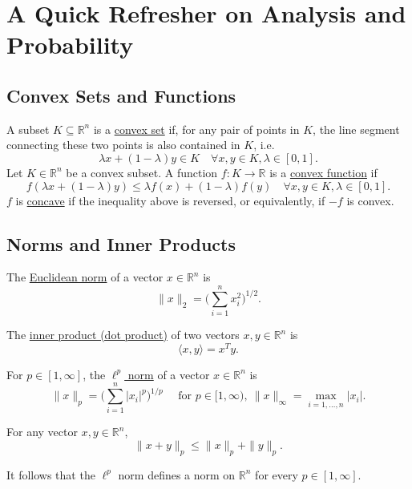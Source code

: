 \section{A Quick Refresher on Analysis and Probability}


\subsection{Convex Sets and Functions}

\begin{definition}[]
\label{def:1.1.1}
A subset $K \subseteq \mathbb{R}^n$ is a \underline{convex set} if, for any pair of points in $K$, the line 
segment connecting these two points is also contained in $K$, i.e. 
\[ \lambda x + (1 - \lambda) y \in K \quad \forall x, y \in K, \lambda \in [0, 1]. \]
Let $K \in \mathbb{R}^n$ be a convex subset. A function $f: K \to \mathbb{R}$ is a \underline{convex 
function} if 
\[ f(\lambda x + (1 - \lambda) y) \leq \lambda f(x) + (1 - \lambda) f(y) \quad \forall x, y \in K, 
\lambda \in [0, 1]. \]	
$f$ is \underline{concave} if the inequality above is reversed, or equivalently, if $-f$ is convex.
\end{definition}


\subsection{Norms and Inner Products}

\begin{definition}[]
\label{def:1.2.1}
The \underline{Euclidean norm} of a vector $x \in \mathbb{R}^n$ is 
\[ \|x\|_2 = \biggl( \sum_{i = 1}^{n} x_i^2 \biggr)^{1/2}. \]
\end{definition}

\begin{definition}[]
\label{def:1.2.2}
The \underline{inner product (dot product)} of two vectors $x, y \in \mathbb{R}^n$ is 
\[ \langle x, y \rangle = x^T y. \]
\end{definition}

\begin{definition}[]
\label{def:1.2.3}
For $p \in [1, \infty]$, the \underline{$\ell^p$ norm} of a vector $x \in \mathbb{R}^n$ is 
\[ \|x\|_p = \biggl( \sum_{i = 1}^{n} |x_i|^p \biggr)^{1/p} \quad \text{ for } p \in [1, \infty), 
\ \|x\|_{\infty} = \max_{i = 1, \dots, n} |x_i|. \]
\end{definition}

\begin{theorem}
\label{def:1.2.4}
For any vector $x, y \in \mathbb{R}^n$, 
\[ \|x + y\|_p \leq \|x\|_p + \|y\|_p. \]
\end{theorem}
It follows that the $\ell^p$ norm defines a norm on $\mathbb{R}^n$  for every $p \in [1, \infty]$.

